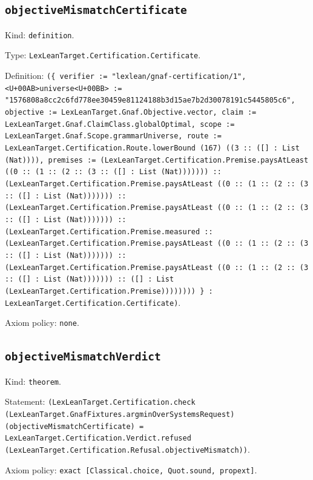 \documentclass[11pt]{article}
\begin{document}
\subsection*{\texttt{objectiveMismatchCertificate}}
\noindent Kind: \texttt{definition}.\par
\noindent Type: \texttt{LexLeanTarget.Certification.Certificate}.\par
\noindent Definition: \texttt{(\{ verifier := "lexlean/gnaf-certification/1", <U+00AB>universe<U+00BB> := "1576808a8cc2c6fd778ee30459e81124188b3d15ae7b2d30078191c5445805c6", objective := LexLeanTarget.Gnaf.Objective.vector, claim := LexLeanTarget.Gnaf.ClaimClass.globalOptimal, scope := LexLeanTarget.Gnaf.Scope.grammarUniverse, route := LexLeanTarget.Certification.Route.lowerBound (167) ((3 :: ([] : List (Nat)))), premises := (LexLeanTarget.Certification.Premise.paysAtLeast ((0 :: (1 :: (2 :: (3 :: ([] : List (Nat))))))) :: (LexLeanTarget.Certification.Premise.paysAtLeast ((0 :: (1 :: (2 :: (3 :: ([] : List (Nat))))))) :: (LexLeanTarget.Certification.Premise.paysAtLeast ((0 :: (1 :: (2 :: (3 :: ([] : List (Nat))))))) :: (LexLeanTarget.Certification.Premise.measured :: (LexLeanTarget.Certification.Premise.paysAtLeast ((0 :: (1 :: (2 :: (3 :: ([] : List (Nat))))))) :: (LexLeanTarget.Certification.Premise.paysAtLeast ((0 :: (1 :: (2 :: (3 :: ([] : List (Nat))))))) :: ([] : List (LexLeanTarget.Certification.Premise)))))))) \} : LexLeanTarget.Certification.Certificate)}.\par
\noindent Axiom policy: \texttt{none}.\par
\subsection*{\texttt{objectiveMismatchVerdict}}
\noindent Kind: \texttt{theorem}.\par
\noindent Statement: \texttt{(LexLeanTarget.Certification.check (LexLeanTarget.GnafFixtures.argminOverSystemsRequest) (objectiveMismatchCertificate) = LexLeanTarget.Certification.Verdict.refused (LexLeanTarget.Certification.Refusal.objectiveMismatch))}.\par
\noindent Axiom policy: \texttt{exact [Classical.choice, Quot.sound, propext]}.\par
\end{document}
